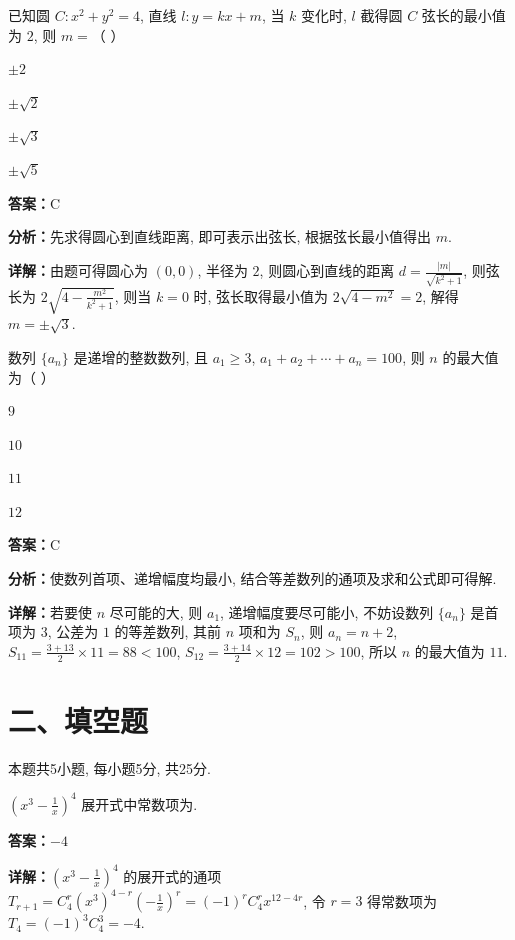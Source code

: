 \begin{question}[points=4]
已知圆 $C:x^2+y^2=4$, 直线 $l:y=kx+m$, 当 $k$ 变化时, $l$ 截得圆 $C$ 弦长的最小值为 $2$, 则 $m=$（ ）
\begin{choices}
  \item $\pm 2$
  \item $\pm \sqrt{2}$
  \item $\pm \sqrt{3}$
  \item $\pm \sqrt{5}$
\end{choices}
\begin{solution}
\textbf{答案：}C

\textbf{分析：}先求得圆心到直线距离, 即可表示出弦长, 根据弦长最小值得出 $m$.

\textbf{详解：}由题可得圆心为 $(0,0)$, 半径为 $2$, 则圆心到直线的距离 $d=\frac{|m|}{\sqrt{k^2+1}}$, 则弦长为 $2\sqrt{4-\frac{m^2}{k^2+1}}$, 则当 $k=0$ 时, 弦长取得最小值为 $2\sqrt{4-m^2}=2$, 解得 $m=\pm\sqrt{3}$.
\end{solution}
\end{question}

\begin{question}[points=4]
数列 $\{a_n\}$ 是递增的整数数列, 且 $a_1\geq 3$, $a_1+a_2+\cdots+a_n=100$, 则 $n$ 的最大值为（ ）
\begin{choices}
  \item $9$
  \item $10$
  \item $11$
  \item $12$
\end{choices}
\begin{solution}
\textbf{答案：}C

\textbf{分析：}使数列首项、递增幅度均最小, 结合等差数列的通项及求和公式即可得解.

\textbf{详解：}若要使 $n$ 尽可能的大, 则 $a_1$, 递增幅度要尽可能小, 不妨设数列 $\{a_n\}$ 是首项为 $3$, 公差为 $1$ 的等差数列, 其前 $n$ 项和为 $S_n$, 则 $a_n=n+2$, $S_{11}=\frac{3+13}{2}\times 11=88<100$, $S_{12}=\frac{3+14}{2}\times 12=102>100$, 所以 $n$ 的最大值为 $11$.
\end{solution}
\end{question}

\section*{二、填空题}
本题共5小题, 每小题5分, 共25分.

\begin{question}[points=5]
$(x^3-\frac{1}{x})^4$ 展开式中常数项为.
\fillin[{$-4$}]
\begin{solution}
\textbf{答案：}$-4$

\textbf{详解：}$(x^3-\frac{1}{x})^4$ 的展开式的通项 $T_{r+1}=C_4^r (x^3)^{4-r}(-\frac{1}{x})^r=(-1)^r C_4^r x^{12-4r}$, 令 $r=3$ 得常数项为 $T_4=(-1)^3 C_4^3=-4$.
\end{solution}
\end{question}

